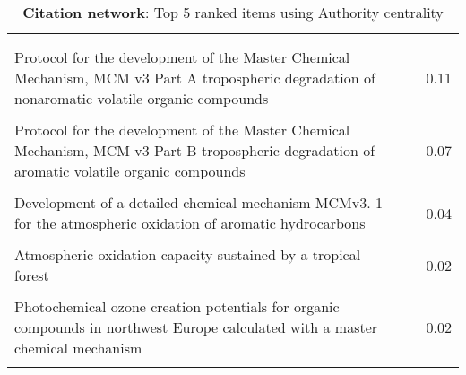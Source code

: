 \begin{table}[H]
     \begin{tabular}{p{}p{}c}
     \toprule
      & & \\\\
     Protocol for the development of the Master Chemical Mechanism, MCM v3 Part A tropospheric degradation of nonaromatic volatile organic compounds & \cite{Authority0} & 0.11  \\ \\
        Protocol for the development of the Master Chemical Mechanism, MCM v3 Part B tropospheric degradation of aromatic volatile organic compounds & \cite{Authority1} & 0.07  \\ \\
        Development of a detailed chemical mechanism MCMv3. 1 for the atmospheric oxidation of aromatic hydrocarbons & \cite{Authority2} & 0.04  \\ \\
        Atmospheric oxidation capacity sustained by a tropical forest & \cite{Authority3} & 0.02  \\ \\
        Photochemical ozone creation potentials for organic compounds in northwest Europe calculated with a master chemical mechanism & \cite{Authority4} & 0.02  \\ \\
        \bottomrule
    \end{tabular}
    \label{tab:Authority_Citation}
    \caption{\textbf{Citation network}: Top 5 ranked items using Authority centrality}
    \end{table}

    